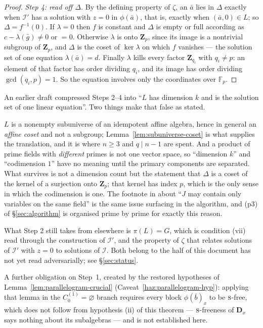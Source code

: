 \begin{proof}[Proof]
\emph{Step 4: read off $\Delta$.} By the defining property of $\zeta$, an
$\bar a$ lies in $\Delta$ exactly when $\mathcal I'$ has a solution with $z=0$
in $\phi(\bar a)$, that is, exactly when $(\bar a,0)\in L$; so
$\Delta=f^{-1}(0)$. If $\lambda=0$ then $f$ is constant and $\Delta$ is empty
or full according as $c-\lambda(\bar g)\neq0$ or $=0$. Otherwise $\lambda$ is
onto $\mathbf Z_{p}$, since its image is a nontrivial subgroup of
$\mathbf Z_{p}$, and $\Delta$ is the coset of $\ker\lambda$ on which $f$
vanishes --- the solution set of one equation $\lambda(\bar a)=d$. Finally
$\lambda$ kills every factor $\mathbf Z_{q_{i}}$ with $q_{i}\neq p$: an element
of that factor has order dividing $q_{i}$, and its image has order dividing
$\gcd(q_{i},p)=1$. So the equation involves only the coordinates over
$\mathbb F_{p}$.
\end{proof}

\begin{hazard}\label{haz:step2-linear-algebra}
An earlier draft compressed Steps 2--4 into ``$L$ has dimension $k$ and is the
solution set of one linear equation''. Two things make that false as stated.

$L$ is a nonempty subuniverse of an idempotent affine algebra, hence in general
an \emph{affine coset} and not a subgroup; Lemma~\ref{lem:subuniverse-coset} is
what supplies the translation, and it is where $n\ge3$ and
$q\mid n-1$ are spent. And a product of prime fields with \emph{different}
primes is not one vector space, so ``dimension $k$'' and ``codimension $1$''
have no meaning until the primary components are separated. What survives is
not a dimension count but the statement that $\Delta$ is a coset of the kernel
of a surjection onto $\mathbf Z_{p}$; that kernel has index $p$, which is the
only sense in which the codimension is one. The footnote in
\cite{ZhukSimplified} about ``$J$ may contain only variables on the same
field'' is the same issue surfacing in the algorithm, and \textup{(p3)} of
\S\ref{sec:algorithm} is organised prime by prime for exactly this reason.

What Step 2 still takes from elsewhere is $\pi(L)=G$, which is condition (vii)
read through the construction of $\mathcal I'$, and the property of $\zeta$
that relates solutions of $\mathcal I'$ with $z=0$ to solutions of
$\mathcal I$. Both belong to the half of \cite{ZhukSimplified} this document
has not yet read adversarially; see \S\ref{sec:status}.

A further obligation on Step~1, created by the restored hypotheses of
Lemma~\ref{lem:parallelogram-crucial}
(Caveat~\ref{haz:parallelogram-hyp}): applying that lemma in the
$C_{0}^{(1)}=\varnothing$ branch requires every block
$\phi(\bar b)_{x}$ to be $\textup{\textsc{s}}$-free, which does not follow from
hypothesis (ii) of this theorem --- $\textup{\textsc{s}}$-freeness of $\mathbf D_{x}$ says
nothing about its subalgebras --- and is not established here.
\end{hazard}

